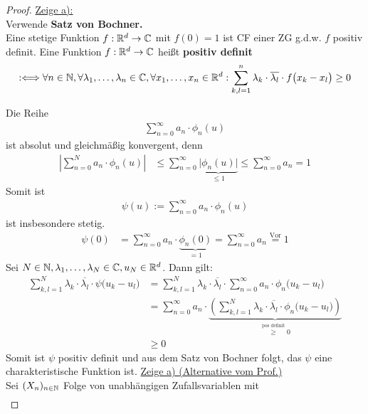 \documentclass[12pt,a4paper]{article}
\begin{document}
\begin{proof}
	\underline{Zeige a):}\\
	Verwende
	\textbf{Satz von Bochner.}\\
		Eine stetige Funktion $f:\mathbb{R}^d\to\mathbb{C}$ mit $f(0)=1$ ist CF einer ZG g.d.w. $f$ positiv definit.\nl
	Eine Funktion $f:\mathbb{R}^d\to\mathbb{C}$ heißt \textbf{positiv definit}
	\begin{align*}
		:\Longleftrightarrow
		\forall n\in\mathbb{N},\forall\lambda_1,\ldots,\lambda_n\in\mathbb{C},\forall x_1,\ldots,x_n\in\mathbb{R}^d:
		\sum\limits_{k,l=1}^n\lambda_k\cdot\overline{\lambda_l}\cdot f\big(x_k-x_l\big)\geq0
	\end{align*}
	
	Die Reihe
	\begin{align*}
		\sum\limits_{n=0}^\infty a_n\cdot\phi_n(u)
	\end{align*}
	ist absolut und gleichmäßig konvergent, denn
	\begin{align*}
		\left|\sum\limits_{n=0}^N a_n\cdot\phi_n(u)\right|
		&\leq\sum\limits_{n=0}^\infty\underbrace{\big|\phi_n(u)\big|}_{\leq1}
		\leq\sum\limits_{n=0}^\infty a_n=1
	\end{align*}
	Somit ist
	\begin{align*}
		\psi(u):=\sum\limits_{n=0}^\infty a_n\cdot\phi_n(u)
	\end{align*}
	ist insbesondere stetig.
	\begin{align*}
		\psi(0)
		&=\sum\limits_{n=0}^\infty a_n\cdot\underbrace{\phi_n(0)}_{=1}
		=\sum\limits_{n=0}^\infty a_n\overset{\text{Vor}}{=}1
	\end{align*}
	Sei $N\in\mathbb{N},\lambda_1,\ldots,\lambda_N\in\mathbb{C},u_N\in\mathbb{R}^d$.
	Dann gilt:
	\begin{align*}
		\sum\limits_{k,l=1}^N\lambda_k\cdot\overline{\lambda_l}\cdot\psi\big(u_k-u_l\big)
		&=\sum\limits_{k,l=1}^N\lambda_k\cdot\overline{\lambda_l}\cdot\sum\limits_{n=0}^\infty a_n\cdot\phi_n\big(u_k-u_l\big)\\
		&=\sum\limits_{n=0}^\infty a_n\cdot\underbrace{\left(\sum\limits_{k,l=1}^N\lambda_k\cdot\overline{\lambda_l}\cdot\phi_n\big(u_k-u_l\big)\right)}_{\overset{\text{pos definit}}{\geq}0}\\
		&\geq0
	\end{align*}		
	Somit ist $\psi$ positiv definit und aus dem Satz von Bochner folgt, das $\psi$ eine charakteristische Funktion ist.\nl
	\underline{Zeige a) (Alternative vom Prof.)}\\
	Sei $(X_n)_{n\in\mathbb{N}}$ Folge von unabhängigen Zufallsvariablen mit
	\begin{align*}

\end{align*}
\end{proof}
\end{document}
